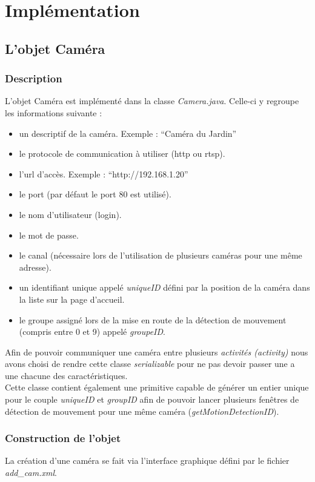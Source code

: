 \chapter{Implémentation}
\section{L'objet Caméra}
\subsection{Description}
L'objet Caméra est implémenté dans la classe \textit{Camera.java}.\newline
Celle-ci y regroupe les informations suivante : 
\begin{itemize} 
\item un descriptif de la caméra. Exemple : ``Caméra du Jardin''
\item le protocole de communication à utiliser (http ou rtsp).
\item l'url d'accès. Exemple : ``http://192.168.1.20''
\item le port (par défaut le port 80 est utilisé).
\item le nom d'utilisateur (login).
\item le mot de passe.
\item le canal (nécessaire lors de l'utilisation de plusieurs caméras pour une
même adresse).
\item un identifiant unique appelé \textit{uniqueID} défini par la position de
la caméra dans la liste sur la page d'accueil.
\item le groupe assigné lors de la mise en route de la détection de mouvement
(compris entre 0 et 9) appelé \textit{groupeID}.\\
\end{itemize}
\indent Afin de pouvoir communiquer une caméra entre plusieurs \textit{activités
(activity)} nous avons choisi de rendre cette classe \textit{serializable} pour
ne pas devoir passer une a une chacune des caractéristiques.\\
Cette classe contient également une primitive capable de générer un entier
unique pour le couple \textit{uniqueID} et \textit{groupID} afin de pouvoir
lancer plusieurs fenêtres de détection de mouvement pour une même caméra
(\textit{getMotionDetectionID}).
\subsection{Construction de l'objet}
La création d'une caméra se fait via l'interface graphique défini par le
fichier \textit{add\_cam.xml}.\newline

